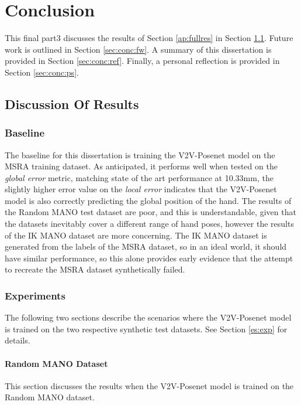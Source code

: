 \chapter{Conclusion}
\label{chap:con}
This final part3 discusses the results of Section \ref{ap:fullres} in Section \ref{sec:conc:dis}. Future work is outlined in Section \ref{sec:conc:fw}. A summary of this dissertation is provided in Section \ref{sec:conc:ref}. Finally, a personal reflection is provided in Section \ref{sec:conc:ps}.

\section{Discussion Of Results}
\label{sec:conc:dis}
\subsection{Baseline}
The baseline for this dissertation is training the V2V-Posenet model on the MSRA training dataset. As anticipated, it performs well when tested on the {\slshape global error} metric, matching state of the art performance at 10.33mm, the slightly higher error value on the {\slshape local error} indicates that the V2V-Posenet model is also correctly predicting the global position of the hand. The results of the Random MANO test dataset are poor, and this is understandable, given that the datasets inevitably cover a different range of hand poses, however the results of the IK MANO dataset are more concerning. The IK MANO dataset is generated from the labels of the MSRA dataset, so in an ideal world, it should have similar performance, so this alone provides early evidence that the attempt to recreate the MSRA dataset synthetically failed.

\subsection{Experiments}
The following two sections describe the scenarios where the V2V-Posenet model is trained on the two respective synthetic test datasets. See Section \ref{es:exp} for details.

\subsubsection{Random MANO Dataset}
\label{conc:rmd:disc}
This section discusses the results when the V2V-Posenet model is trained on the Random MANO dataset. 

